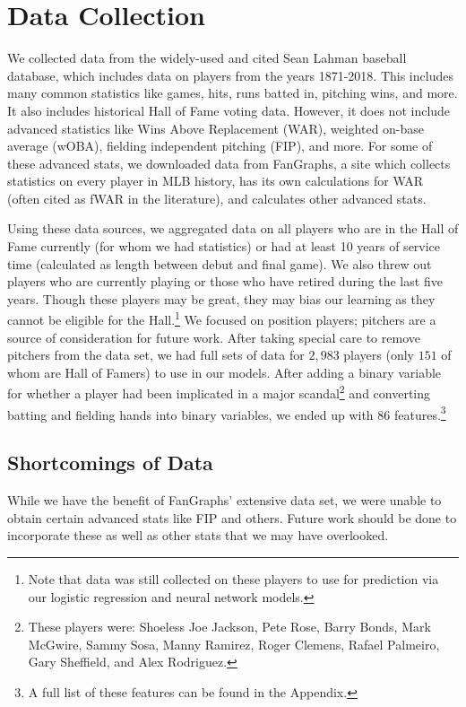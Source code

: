 \documentclass{sigkddExp}
\begin{document}
\section{Data Collection}
We collected data from the widely-used and cited Sean Lahman baseball database, which includes data on players from the years 1871-2018. This includes many common statistics like games, hits, runs batted in, pitching wins, and more. It also includes historical Hall of Fame voting data. However, it does not include advanced statistics like Wins Above Replacement (WAR), weighted on-base average (wOBA), fielding independent pitching (FIP), and more. For some of these advanced stats, we downloaded data from FanGraphs, a site which collects statistics on every player in MLB history, has its own calculations for WAR (often cited as fWAR in the literature), and calculates other advanced stats. 

Using these data sources, we aggregated data on all players who are in the Hall of Fame currently (for whom we had statistics) or had at least 10 years of service time (calculated as length between debut and final game). We also threw out players who are currently playing or those who have retired during the last five years. Though these players may be great, they may bias our learning as they cannot be eligible for the Hall.\footnote{Note that data was still collected on these players to use for prediction via our logistic regression and neural network models.} We focused on position players; pitchers are a source of consideration for future work. After taking special care to remove pitchers from the data set, we had full sets of data for $2,983$ players (only $151$ of whom are Hall of Famers) to use in our models. After adding a binary variable for whether a player had been implicated in a major scandal\footnote{These players were: Shoeless Joe Jackson, Pete Rose, Barry Bonds, Mark McGwire, Sammy Sosa, Manny Ramirez, Roger Clemens, Rafael Palmeiro, Gary Sheffield, and Alex Rodriguez.} and converting batting and fielding hands into binary variables, we ended up with 86 features.\footnote{A full list of these features can be found in the Appendix.}

\subsection{Shortcomings of Data}
While we have the benefit of FanGraphs' extensive data set, we were unable to obtain certain advanced stats like FIP and others. Future work should be done to incorporate these as well as other stats that we may have overlooked.
\end{document}

